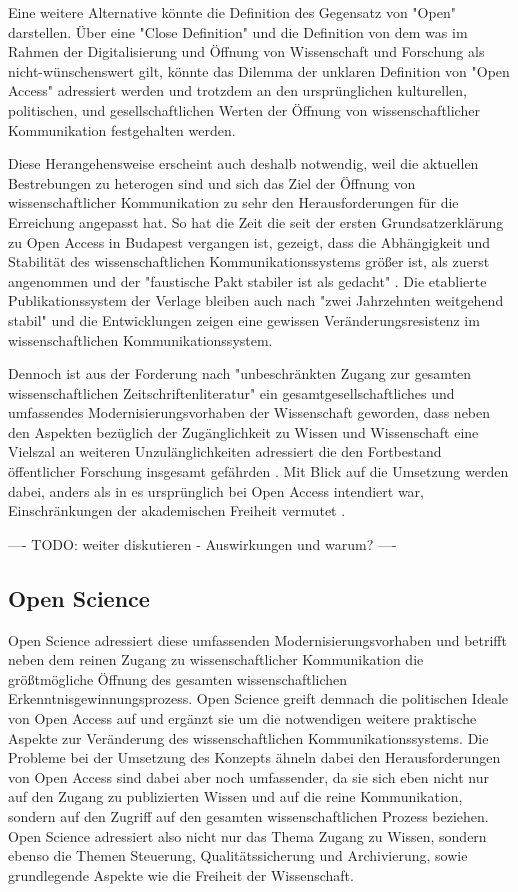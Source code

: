 Eine weitere Alternative könnte die Definition des Gegensatz von "Open" darstellen. Über eine "Close Definition" und die Definition von dem was im Rahmen der Digitalisierung und Öffnung von Wissenschaft und Forschung als nicht-wünschenswert gilt, könnte das Dilemma der unklaren Definition von "Open Access" adressiert werden und trotzdem an den ursprünglichen kulturellen, politischen, und gesellschaftlichen Werten der Öffnung von wissenschaftlicher Kommunikation festgehalten werden.

Diese Herangehensweise erscheint auch deshalb notwendig, weil die aktuellen Bestrebungen zu heterogen sind und sich das Ziel der Öffnung von wissenschaftlicher Kommunikation zu sehr den Herausforderungen für die Erreichung angepasst hat. So hat die Zeit die seit der ersten Grundsatzerklärung zu Open Access in Budapest vergangen ist, gezeigt, dass die Abhängigkeit und Stabilität des wissenschaftlichen Kommunikationssystems größer ist, als zuerst angenommen und der "faustische Pakt stabiler ist als gedacht" \cite{hagner_2015_sache_buches}. Die etablierte Publikationssystem der Verlage bleiben auch nach "zwei Jahrzehnten weitgehend stabil" \cite{Hanekop_2014} und die Entwicklungen zeigen eine gewissen Veränderungsresistenz im wissenschaftlichen Kommunikationssystem.

Dennoch ist aus der Forderung nach "unbeschränkten Zugang zur gesamten wissenschaftlichen Zeitschriftenliteratur" \cite{boai_2012} ein gesamtgesellschaftliches und umfassendes Modernisierungsvorhaben der Wissenschaft geworden, dass neben den Aspekten bezüglich der Zugänglichkeit zu Wissen und Wissenschaft eine Vielszal an weiteren Unzulänglichkeiten adressiert die den Fortbestand öffentlicher Forschung insgesamt gefährden \cite{brembs2015open}. Mit Blick auf die Umsetzung werden dabei, anders als in es ursprünglich bei Open Access intendiert war, Einschränkungen der akademischen Freiheit vermutet \cite{hagner_2015_sache_buches}.

---- TODO: weiter diskutieren - Auswirkungen und warum? ----

\subsection{Open Science}

Open Science adressiert diese umfassenden Modernisierungsvorhaben und betrifft neben dem reinen Zugang zu wissenschaftlicher Kommunikation die größtmögliche Öffnung des gesamten wissenschaftlichen Erkenntnisgewinnungsprozess. Open Science greift demnach die politischen Ideale von Open Access auf und ergänzt sie um die notwendigen weitere praktische Aspekte zur Veränderung des wissenschaftlichen Kommunikationssystems. Die Probleme bei der Umsetzung des Konzepts ähneln dabei den Herausforderungen von Open Access sind dabei aber noch umfassender, da sie sich eben nicht nur auf den Zugang zu publizierten Wissen und auf die reine Kommunikation, sondern auf den Zugriff auf den gesamten wissenschaftlichen Prozess beziehen. Open Science adressiert also nicht nur das Thema Zugang zu Wissen, sondern ebenso die Themen Steuerung, Qualitätssicherung und Archivierung, sowie grundlegende Aspekte wie die Freiheit der Wissenschaft.

